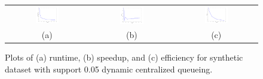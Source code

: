 \begin{figure}
\centering
\begin{tabular}{ccc}
\includegraphics[width=0.3\textwidth]{synth_dyn_time.png} &
\includegraphics[width=0.3\textwidth]{synth_dyn_speedup.png} &
\includegraphics[width=0.3\textwidth]{synth_dyn_efficiency.png} \\
(a) & (b) & (c) \\
\end{tabular}
\caption{Plots of (a) runtime, (b) speedup, and (c) efficiency for
         synthetic dataset with support 0.05 dynamic centralized queueing.}
\label{fig:synth_dyn}
\end{figure}


